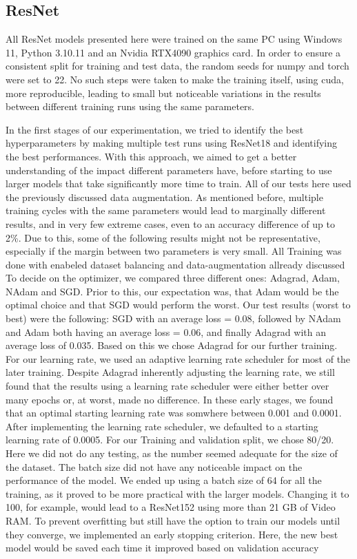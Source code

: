 \subsection{ResNet}\label{resultsReNet}

\label{setup}
All ResNet models presented here were trained on the same PC using Windows 11, Python 3.10.11 and an Nvidia RTX4090 graphics card. In order to ensure a consistent split for training and test data, the random seeds for numpy and torch were set to 22. No such steps were taken to make the training itself, using cuda, more reproducible, leading to small but noticeable variations in the results between different training runs using the same parameters.

\label{Hyperparameters}
In the first stages of our experimentation, we tried to identify the best hyperparameters by making multiple test runs using ResNet18 and identifying the best performances. With this approach, we aimed to get a better understanding of the impact different parameters have, before starting to use larger models that take significantly more time to train. All of our tests here used the previously discussed data augmentation. As mentioned before, multiple training cycles with the same parameters would lead to marginally different results, and in very few extreme cases, even to an accuracy difference of up to 2\%. Due to this, some of the following results might not be representative, especially if the margin between two parameters is very small. All Training was done with enabeled dataset balancing and data-augmentation allready discussed To decide on the optimizer, we compared three different ones: Adagrad, Adam, NAdam and SGD\@. Prior to this, our expectation was, that Adam would be the optimal choice and that SGD would perform the worst. Our test results (worst to best) were the following: SGD with an average loss = 0.08, followed by NAdam and Adam both having an average loss = 0.06, and finally Adagrad with an average loss of 0.035. Based on this we chose Adagrad for our further training. For our learning rate, we used an adaptive learning rate scheduler for most of the later training. Despite Adagrad inherently adjusting the learning rate, we still found that the results using a learning rate scheduler were either better over many epochs or, at worst, made no difference. In these early stages, we found that an optimal starting learning rate was somwhere between 0.001 and 0.0001. After implementing the learning rate scheduler, we defaulted to a starting learning rate of 0.0005. For our Training and validation split, we chose 80/20. Here we did not do any testing, as the number seemed adequate for the size of the dataset. The batch size did not have any noticeable impact on the performance of the model. We ended up using a batch size of 64 for all the training, as it proved to be more practical with the larger models. Changing it to 100, for example, would lead to a ResNet152 using more than 21 GB of Video RAM\@. To prevent overfitting but still have the option to train our models until they converge, we implemented an early stopping criterion. Here, the new best model would be saved each time it improved based on validation accuracy 